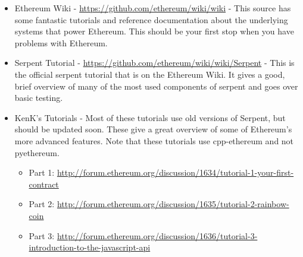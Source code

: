 \documentclass[12pt]{article}
\begin{document}
\begin{itemize}
	\item Ethereum Wiki - \url{https://github.com/ethereum/wiki/wiki} - This source has some fantastic tutorials and reference documentation about the underlying systems that power Ethereum. This should be your first stop when you have problems with Ethereum.
	\item Serpent Tutorial - \url{https://github.com/ethereum/wiki/wiki/Serpent} - This is the official serpent tutorial that is on the Ethereum Wiki. It gives a good, brief overview of many of the most used components of serpent and goes over basic testing.
	\item KenK's Tutorials - Most of these tutorials use old versions of Serpent, but should be updated soon. These give a great overview of some of Ethereum's more advanced features. Note that these tutorials use cpp-ethereum and not pyethereum.
	\begin{itemize}
	\item Part 1: \url{http://forum.ethereum.org/discussion/1634/tutorial-1-your-first-contract}
	\item Part 2: \url{http://forum.ethereum.org/discussion/1635/tutorial-2-rainbow-coin}
	\item Part 3: \url{http://forum.ethereum.org/discussion/1636/tutorial-3-introduction-to-the-javascript-api}
	\end{itemize}
\end{itemize}



\end{document}
